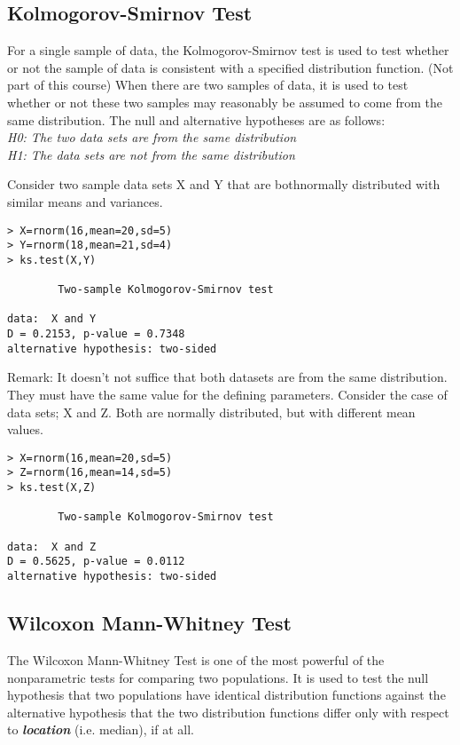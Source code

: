 \subsection{Kolmogorov-Smirnov Test}

For a single sample of data, the Kolmogorov-Smirnov test is used to test whether or not the sample of data is consistent with a specified distribution function. (Not part of this course)
When there are two samples of data, it is used to test whether or not these two samples may reasonably be assumed to come from the same distribution.
The null and alternative hypotheses are as follows:\\
\emph{
H0: The two data sets are from the same distribution\\
H1: The data sets are not from the same distribution\\
}

Consider two sample data sets X and Y that are bothnormally distributed with similar means and variances.
\begin{framed}
\begin{verbatim}
> X=rnorm(16,mean=20,sd=5)
> Y=rnorm(18,mean=21,sd=4)
> ks.test(X,Y)

        Two-sample Kolmogorov-Smirnov test

data:  X and Y
D = 0.2153, p-value = 0.7348
alternative hypothesis: two-sided
\end{verbatim}
\end{framed}
Remark: It doesn’t not suffice that both datasets are from the same distribution. They must have the same value for the defining parameters. Consider the case of data sets; X and Z. Both are normally distributed, but with different mean values.
\begin{framed}
\begin{verbatim}
> X=rnorm(16,mean=20,sd=5)
> Z=rnorm(16,mean=14,sd=5)
> ks.test(X,Z)

        Two-sample Kolmogorov-Smirnov test

data:  X and Z
D = 0.5625, p-value = 0.0112
alternative hypothesis: two-sided
\end{verbatim}
\end{framed}

\subsection{Wilcoxon Mann-Whitney Test}
The Wilcoxon Mann-Whitney Test is one of the most powerful of the nonparametric tests for comparing two populations. It is used to test the null hypothesis that two populations have identical distribution functions against the alternative hypothesis that the two distribution functions differ only with respect to \textbf{\emph{location}} (i.e. median), if at all.

